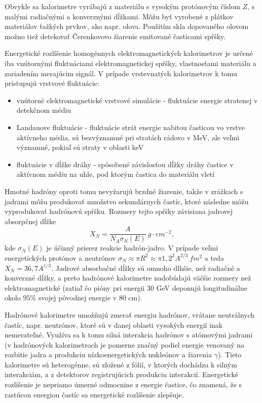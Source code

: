 \documentclass[../../main.tex]{subfiles}
\begin{document}
Obvykle sa kalorimetre vyrábajú z materiálu s vysokým protónovým číslom $Z$, s malými radiačnými a konverznými dĺžkami. Môžu byť vyrobené z plátkov materiálov ťažkých prvkov, ako napr. olova. Použitím skla dopovaného olovom možno tiež detekovať Čerenkovovo žiarenie emitované časticami spŕšky.

Energetické rozlíšenie homogénnych elektromagnetických kalorimetrov je určené iba vnútornými fluktuáciami elektromagnetickej spŕšky, vlastnosťami materiálu a zariadením merajúcim signál. V prípade vrstevnatých kalorimetrov k tomu pristupujú vrstvové fluktuácie:
\begin{itemize}
\item vnútorné elektromagnetické vrstvové simulácie - fluktuácie energie stratenej v detekčnom médiu
\item Landauove fluktuácie - fluktuácie strát energie nabitou časticou vo vrstve aktívneho média, sú bezvýznamné pri stratách rádovo v MeV, ale veľmi významné, pokiaľ sú straty v oblasti keV
\item fluktuácie v dĺžke dráhy - spôsobené závislosťou dĺžky dráhy častice v aktívnom médiu na uhle, pod ktorým častica do materiálu vletí
\end{itemize}

Hmotné hadróny oproti tomu nevyžarujú brzdné žiarenie, takže v zrážkach s jadrami môžu produkovať množstvo sekundárnych častíc, ktoré následne môžu vyprodukovať hadrónovú spŕšku. Rozmery tejto spŕšky závisiana jadrovej absorpčnej dĺžke
\begin{equation}
X_N=\dfrac{A}{N_A\sigma_N(E)}\:\unit{g\cdot cm^{-2}},
\end{equation}
kde $\sigma_N(E)$ je účinný prierez reakcie hadrón-jadro. V prípade veľmi energetických protónov a neutrónov $\sigma_N\approx \pi R^2\approx \pi 1,2^2A^{2/3}\:\unit{fm^2}$ a teda $X_N=36,7A^{1/3}$. Jadrové absorbačné dĺžky sú omnoho dlhšie, než radiačné a konverzné dĺžky, a preto hadrónové kalorimetre nadobúdajú väčšie rozmery než elektromagnetické (zatiaľ čo pióny pri energii 30 GeV deponujú longitudinálne okolo $95\%$ svojej pôvodnej energie v 80 cm).

Hadrónové kalorimetre umožňujú zmerať energiu hadrónov, vrátane neutrálnych častíc, napr. neutrónov, ktoré sú v danej oblasti vysokých energií inak nemerateľné. Využíva sa k tomu silná interakcia hadrónov s atómovými jadrami (v hadrónových kalorimetroch je pomerne značný podiel energie venovaný na rozbitie jadra a produkciu nízkoenergetických nukleónov a žiarenia $\gamma$). Tieto kalorimetre sú heterogénne, sú zložené z fólií, v ktorých dochádza k silným interakciám, a z detektorov registrujúcich produkciu interakcií. Energetické rozlíšenie je nepriamo úmerné odmocnine z energie častice, čo znamená, že s rastúcou energiou častíc sa energetické rozlíšenie zlepšuje.
\end{document}
